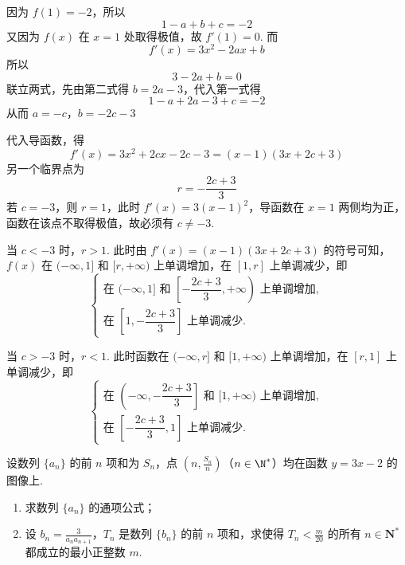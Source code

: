 \begin{solution}
因为 \(f(1)=-2\)，所以
\[
1-a+b+c=-2
\]
又因为 \(f(x)\) 在 \(x=1\) 处取得极值，故 \(f'(1)=0\). 而
\[
f'(x)=3x^2-2ax+b
\]
所以
\[
3-2a+b=0
\]
联立两式，先由第二式得 \(b=2a-3\)，代入第一式得
\[
1-a+2a-3+c=-2
\]
从而
\(a=-c\)，\(b=-2c-3\)

代入导函数，得
\[
f'(x)=3x^2+2cx-2c-3
=(x-1)(3x+2c+3)
\]
另一个临界点为
\[
r=-\frac{2c+3}{3}
\]
若 \(c=-3\)，则 \(r=1\)，此时 \(f'(x)=3(x-1)^2\)，导函数在 \(x=1\) 两侧均为正，函数在该点不取得极值，故必须有 \(c\ne-3\).

当 \(c<-3\) 时，\(r>1\). 此时由 \(f'(x)=(x-1)(3x+2c+3)\) 的符号可知，\(f(x)\) 在 \((-\infty,1]\) 和 \([r,+\infty)\) 上单调增加，在 \([1,r]\) 上单调减少，即
\[
\begin{cases}
\text{在 }(-\infty,1]\text{ 和 }\left[-\dfrac{2c+3}{3},+\infty\right)\text{ 上单调增加},\\
\text{在 }\left[1,-\dfrac{2c+3}{3}\right]\text{ 上单调减少}.
\end{cases}
\]

当 \(c>-3\) 时，\(r<1\). 此时函数在 \((-\infty,r]\) 和 \([1,+\infty)\) 上单调增加，在 \([r,1]\) 上单调减少，即
\[
\begin{cases}
\text{在 }\left(-\infty,-\dfrac{2c+3}{3}\right]\text{ 和 }[1,+\infty)\text{ 上单调增加},\\
\text{在 }\left[-\dfrac{2c+3}{3},1\right]\text{ 上单调减少}.
\end{cases}
\]
\end{solution}

\begin{problem}
设数列 \(\{a_{n}\}\) 的前 \(n\) 项和为 \(S_{n}\)，点 \(\left(n, \frac{S_{n}}{n}\right)\)（\(n \in \N^{*}\)）均在函数 \(y = 3x - 2\) 的图像上.

\begin{enumerate}
\item 求数列 \(\{a_{n}\}\) 的通项公式；
\item 设 \(b_n = \frac{3}{a_n a_{n+1}}\)，\(T_n\) 是数列 \(\{b_n\}\) 的前 \(n\) 项和，求使得 \(T_n < \frac{m}{20}\) 的所有 \(n \in \mathbf{N}^*\) 都成立的最小正整数 \(m\).
\end{enumerate}
\end{problem}

